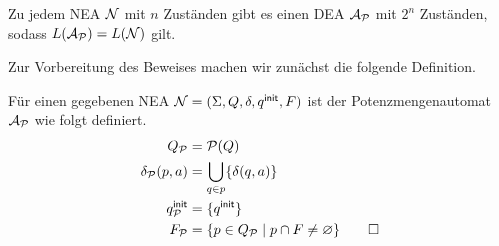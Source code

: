 \begin{Satz}\label{satz:2.rabinscott}
	Zu jedem \ac{NEA} $\mathcal{N}$ mit $n$ Zuständen gibt es einen \ac{DEA} $\mathcal{A}_{\mathcal{P}}$ mit $2^n$ Zuständen, sodass $L(\mathcal{A}_{\mathcal{P}})=L(\mathcal{N})$ gilt.
\end{Satz}
  Zur Vorbereitung des Beweises machen wir zunächst die folgende Definition.

\begin{Def}[Potenzmengenautomat]
 Für einen gegebenen \ac{NEA}  $\mathcal{N}= (\Sigma, Q,\delta,q^\mathsf{init},F)$ ist der Potenzmengenautomat $\mathcal{A}_{\mathcal{P}}$ wie folgt definiert.
         \begin{align*}
                Q_{\mathcal{P}} &= \mathcal{P}(Q)\\
                \delta_{\mathcal{P}}(p,a) &= \bigcup_{q\in p} \{\delta(q,a)\}\\
                q^\mathsf{init}_{\mathcal{P}} &= \{q^\mathsf{init}\}\\
                F_{\mathcal{P}} &= \{ p\in Q_{\mathcal{P}} \mid p\cap F\neq \varnothing \}
                \qedhere
        \end{align*}
\end{Def}

